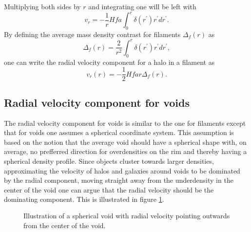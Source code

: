 Multiplying both sides by $r$ and integrating one will be left with
\begin{equation}
    v_r=-\frac{1}{r}Hfa\int_0^r\delta(r^\prime) r^\prime dr^\prime.
\end{equation}
By defining the average mass density contrast for filaments $\Delta_f(r)$
as
\begin{equation}\label{eq:contrastfil}
    \Delta_f(r)=\frac{2}{r^2}\int_0^r\delta(r^\prime) r^\prime dr^\prime,
\end{equation}
one can write the radial velocity component for a halo in a filament as
\begin{equation}\label{vrfilament}
    v_r(r) = -\frac{1}{2}Hfar\Delta_f(r).
\end{equation}
\subsection{Radial velocity component for voids}
The radial velocity component for voids is similar to the one for filaments
except that for voids one assumes a spherical coordinate system. This assumption
is based on the notion that the average void should have a spherical shape with,
on average, no prefferred direction for overdensities on the rim and
thereby having a spherical density profile. Since objects cluster towards larger
densities, approximating the velocity of halos and galaxies around
voids to be dominated by the radial component, moving straight away from the
underdensity in the center of the void one can argue that the radial velocity
should be the dominating component. This is illustrated in figure \ref{fig:filamentvr}.
\begin{figure}\label{fig:filamentvr}
    \caption{Illustration of a spherical void with radial velocity pointing outwards from the center of the void.}
\end{figure}
